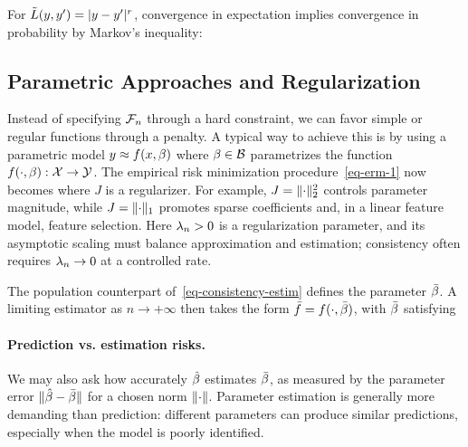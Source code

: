 For $\tilde{L}(y,y')=|y-y'|^r$, convergence in expectation implies convergence in probability by Markov's inequality:

\subsection{Parametric Approaches and Regularization}

Instead of specifying $\mathcal{F}_n$ through a hard constraint, we can favor simple or regular functions through a penalty.
%
A typical way to achieve this is by using a parametric model $y \approx f(x,\beta)$ where $\beta \in \mathcal{B}$ parametrizes the function $f(\cdot,\beta) : \mathcal{X} \rightarrow \mathcal{Y}$. The empirical risk minimization procedure~\eqref{eq-erm-1} now becomes 
where $J$ is a regularizer. For example, $J=\lVert\cdot\rVert_2^2$ controls parameter magnitude, while $J=\lVert\cdot\rVert_1$ promotes sparse coefficients and, in a linear feature model, feature selection. Here $\lambda_n>0$ is a regularization parameter, and its asymptotic scaling must balance approximation and estimation; consistency often requires $\lambda_n\to0$ at a controlled rate.

The population counterpart of~\eqref{eq-consistency-estim} defines the parameter $\bar {\beta}$. A limiting estimator as $n \rightarrow +\infty$ then takes the form $\bar f = f(\cdot,\bar {\beta})$, with $\bar {\beta}$ satisfying



\paragraph{Prediction vs. estimation risks.}

We may also ask how accurately $\hat{\beta}$ estimates $\bar{\beta}$, as measured by the parameter error $\lVert\hat{\beta}-\bar{\beta}\rVert$ for a chosen norm $\lVert\cdot\rVert$. Parameter estimation is generally more demanding than prediction: different parameters can produce similar predictions, especially when the model is poorly identified.


